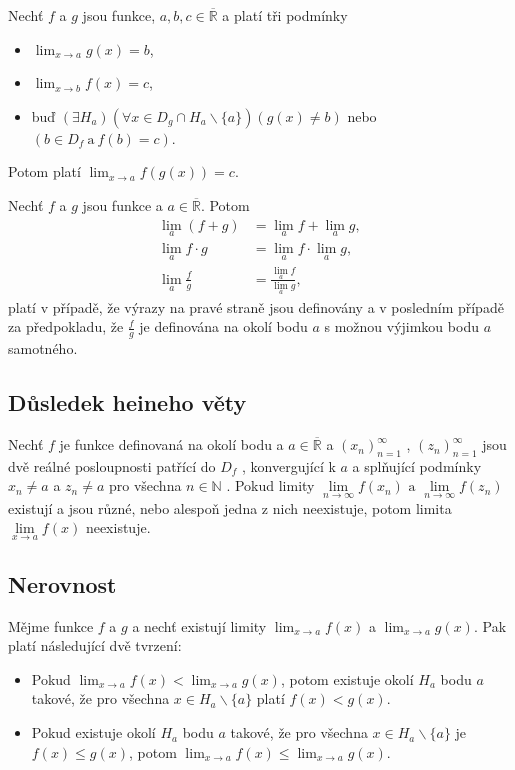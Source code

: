 \documentclass{szzclass}
\begin{document}
\newpage

Nechť $f$ a $g$ jsou funkce, 
$a,b,c \in \overline{\mathbb{R}}$ a platí tři podmínky
\begin{itemize}
    \item $\displaystyle\lim_{x\to a} g(x) = b$,
    \item $\displaystyle\lim_{x\to b} f(x) = c$,
    \item buď $(\exists H_a)(\forall x\in D_g\cap H_a \backslash \{a\})(g(x) \neq b)$ nebo $(b\in D_f \ \text{a} \ f(b) = c)$.
\end{itemize}
Potom platí  $\displaystyle\lim_{x\to a} f(g(x)) = c$.


Nechť $f$ a $g$ jsou funkce a 
$a \in \overline{\mathbb{R}}$. Potom
\begin{equation*}
\begin{aligned} \lim_a (f + g) &= \lim_a f + \lim_a g, \\ \lim_a f \cdot g &= \lim_a f \cdot \lim_a g, \\ \lim_a \frac{f}{g} &= \frac{\lim_a f}{\lim_a g}, \end{aligned}\end{equation*}
platí v případě, že výrazy na pravé straně jsou definovány a v posledním případě za předpokladu, že 
$\frac{f}{g}$
je definována na okolí bodu 
$a$
s možnou výjimkou bodu 
$a$
samotného.

\subsection{Důsledek heineho věty}
Nechť 
$f$
 je funkce definovaná na okolí bodu 
a
$a\in\overline{\mathbb{R}}$
 a 
$(x_n)_{n=1}^\infty$
, 
$(z_n)_{n=1}^\infty$
 jsou dvě reálné posloupnosti patřící do 
$D_f$
, konvergující k 
$a$
 a splňující podmínky 
$x_n\neq a$
 a 
 $z_n\neq a$
 pro všechna 
$n\in\mathbb{N}$
. Pokud limity
$\lim\limits_{n\to\infty} f(x_n) \textrm{ a } \lim\limits_{n\to\infty} f(z_n)$
existují a jsou různé, nebo alespoň jedna z nich neexistuje, potom limita  
$\lim\limits_{x \rightarrow a} f(x)$
neexistuje.

\subsection{Nerovnost}

Mějme funkce $f$ a 
$g$ a nechť existují limity  
$\displaystyle\lim_{x\to a} f(x)$ a  
$\displaystyle\lim_{x\to a} g(x)$.
Pak platí následující dvě tvrzení:
\begin{itemize}
    \item Pokud $\displaystyle\lim_{x\to a} f(x) < \lim_{x\to a} g(x)$,
    potom existuje okolí $H_a$ bodu $a$ takové, že pro všechna
    $x\in H_a \backslash\{a\}$ platí $f(x) < g(x)$.
    \item Pokud existuje okolí $H_a$ bodu $a$ takové, že pro všechna
    $x\in H_a \backslash\{a\}$ je $f(x) \leq g(x)$, potom
    $\displaystyle \lim_{x\to a} f(x) \leq \lim_{x\to a} g(x)$.
\end{itemize}
\end{document}
